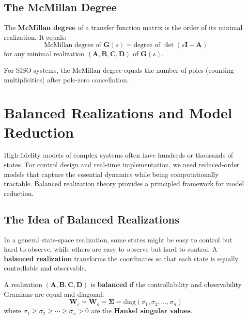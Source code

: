 \subsection{The McMillan Degree}

The \textbf{McMillan degree} of a transfer function matrix is the order of its minimal realization. It equals:
\begin{equation}
\text{McMillan degree of } \mathbf{G}(s) = \text{degree of } \det(s\mathbf{I} - \mathbf{A})
\end{equation}
for any minimal realization $(\mathbf{A}, \mathbf{B}, \mathbf{C}, \mathbf{D})$ of $\mathbf{G}(s)$.

For SISO systems, the McMillan degree equals the number of poles (counting multiplicities) after pole-zero cancellation.


\section{Balanced Realizations and Model Reduction}
\label{sec:balanced_realizations}

High-fidelity models of complex systems often have hundreds or thousands of states. For control design and real-time implementation, we need reduced-order models that capture the essential dynamics while being computationally tractable. Balanced realization theory provides a principled framework for model reduction.

\subsection{The Idea of Balanced Realizations}

In a general state-space realization, some states might be easy to control but hard to observe, while others are easy to observe but hard to control. A \textbf{balanced realization} transforms the coordinates so that each state is equally controllable and observable.

\begin{definition}
A realization $(\mathbf{A}, \mathbf{B}, \mathbf{C}, \mathbf{D})$ is \textbf{balanced} if the controllability and observability Gramians are equal and diagonal:
\begin{equation}
\mathbf{W}_c = \mathbf{W}_o = \boldsymbol{\Sigma} = \text{diag}(\sigma_1, \sigma_2, \ldots, \sigma_n)
\end{equation}
where $\sigma_1 \geq \sigma_2 \geq \cdots \geq \sigma_n > 0$ are the \textbf{Hankel singular values}.
\end{definition}

